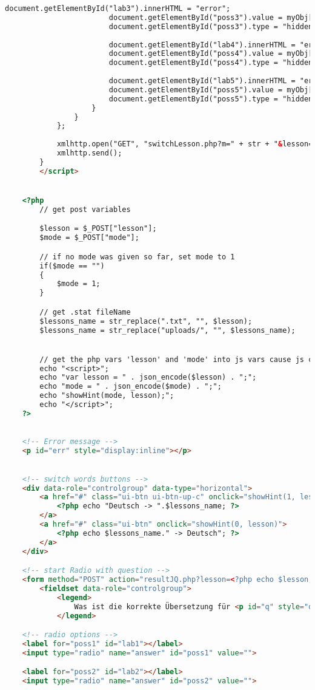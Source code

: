 \documentclass{scrartcl}
\begin{document}
\begin{itemize}
\begin{lstlisting}[language=html]
						document.getElementById("lab3").innerHTML = "error";
						document.getElementById("poss3").value = myObj[3];
						document.getElementById("poss3").type = "hidden";
	
						document.getElementById("lab4").innerHTML = "error";
						document.getElementById("poss4").value = myObj[4];
						document.getElementById("poss4").type = "hidden";
	
						document.getElementById("lab5").innerHTML = "error";
						document.getElementById("poss5").value = myObj[5];	
						document.getElementById("poss5").type = "hidden";
					}
				}
			};
		
			xmlhttp.open("GET", "switchLesson.php?m=" + str + "&lesson=" + lesson, true);
			xmlhttp.send();
		}
		</script>


	<?php
		// get post variables

		$lesson = $_POST["lesson"];
		$mode = $_POST["mode"];

		// if no mode was given so far, set mode to 1
		if($mode == "")
		{
			$mode = 1;
		}

		// get .stat fileName
		$lessons_name = str_replace(".txt", "", $lesson);
		$lessons_name = str_replace("uploads/", "", $lessons_name);


		// get the php vars 'lesson' and 'mode' into js vars cause js can't read in POST's
		echo "<script>";
		echo "var lesson = " . json_encode($lesson) . ";";
		echo "mode = " . json_encode($mode) . ";";
		echo "showHint(mode, lesson);";
		echo "</script>";
	?>	
	

	<!-- Error message -->
	<p id="err" style="display:inline"></p>
	

	<!-- switch words buttons -->
	<div data-role="controlgroup" data-type="horizontal">
		<a href="#" class="ui-btn ui-btn-up-c" onclick="showHint(1, lesson)">
			<?php echo "Deutsch -> ".$lessons_name; ?>
		</a>
		<a href="#" class="ui-btn" onclick="showHint(0, lesson)">
			<?php echo $lessons_name." -> Deutsch"; ?>
		</a>
	</div>

	<!-- start Radio with question -->
	<form method="POST" action="resultJQ.php?lesson=<?php echo $lesson;?>"">
		<fieldset data-role="controlgroup">
			<legend>
				Was ist die korrekte Übersetzung für <p id="q" style="display:inline"></p>?
			</legend>

	<!-- radio options -->
	<label for="poss1" id="lab1"></label>
	<input type="radio" name="answer" id="poss1" value="">

	<label for="poss2" id="lab2"></label>
	<input type="radio" name="answer" id="poss2" value="">


\end{lstlisting}
\end{itemize}
\end{document}
